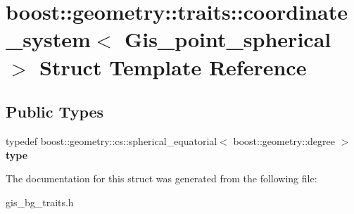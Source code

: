 \hypertarget{structboost_1_1geometry_1_1traits_1_1coordinate__system_3_01Gis__point__spherical_01_4}{}\section{boost\+:\+:geometry\+:\+:traits\+:\+:coordinate\+\_\+system$<$ Gis\+\_\+point\+\_\+spherical $>$ Struct Template Reference}
\label{structboost_1_1geometry_1_1traits_1_1coordinate__system_3_01Gis__point__spherical_01_4}
\subsection*{Public Types}
\begin{DoxyCompactItemize}
\item 
\mbox{\label{structboost_1_1geometry_1_1traits_1_1coordinate__system_3_01Gis__point__spherical_01_4_adbe22731f8f413a12eb789f95a4784ae}} 
typedef boost\+::geometry\+::cs\+::spherical\+\_\+equatorial$<$ boost\+::geometry\+::degree $>$ {\bfseries type}
\end{DoxyCompactItemize}


The documentation for this struct was generated from the following file\+:\begin{DoxyCompactItemize}
\item 
gis\+\_\+bg\+\_\+traits.\+h\end{DoxyCompactItemize}
